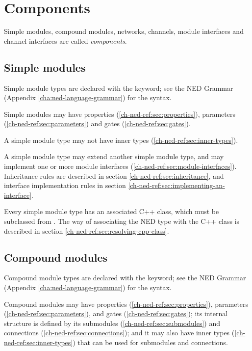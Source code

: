\section{Components}

Simple modules, compound modules, networks, channels, module interfaces
and channel interfaces are called \textit{components}.


\subsection{Simple modules}
\label{ch-ned-ref:sec:simple-modules}

Simple module types are declared with the  keyword;
see the NED Grammar (Appendix \ref{cha:ned-language-grammar}) for the
syntax.

Simple modules may have properties (\ref{ch-ned-ref:sec:properties}),
parameters (\ref{ch-ned-ref:sec:parameters})
and gates (\ref{ch-ned-ref:sec:gates}).

A simple module type may not have inner types (\ref{ch-ned-ref:sec:inner-types}).

A simple module type may extend another simple module type, and
may implement one or more module interfaces (\ref{ch-ned-ref:sec:module-interfaces}).
Inheritance rules are described in section \ref{ch-ned-ref:sec:inheritance},
and interface implementation rules in section \ref{ch-ned-ref:sec:implementing-an-interface}.

Every simple module type has an associated C++ class, which must be
subclassed from . The way of associating the
NED type with the C++ class is described in section
\ref{ch-ned-ref:sec:resolving-cpp-class}.



\subsection{Compound modules}
\label{ch-ned-ref:sec:compound-modules}

Compound module types are declared with the  keyword;
see the NED Grammar (Appendix \ref{cha:ned-language-grammar}) for the
syntax.

Compound modules may have properties (\ref{ch-ned-ref:sec:properties}),
parameters (\ref{ch-ned-ref:sec:parameters}),
and gates (\ref{ch-ned-ref:sec:gates}); its internal structure is defined by
its submodules (\ref{ch-ned-ref:sec:submodules}) and
connections (\ref{ch-ned-ref:sec:connections});
and it may also have inner types (\ref{ch-ned-ref:sec:inner-types})
that can be used for submodules and connections.

